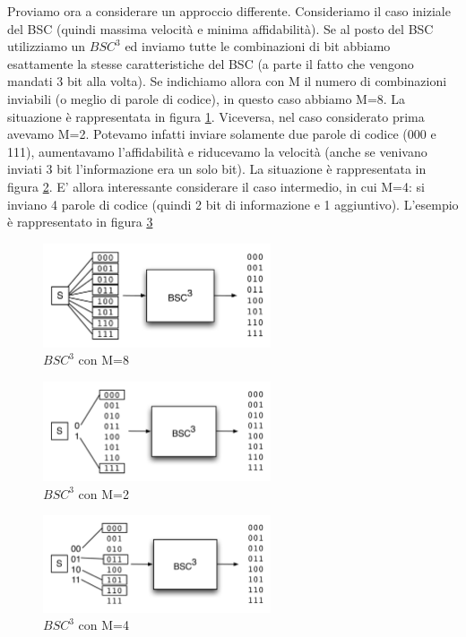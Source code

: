 Proviamo ora a considerare un approccio differente. Consideriamo il caso iniziale del BSC (quindi massima velocità e minima affidabilità). Se al posto del BSC utilizziamo un $BSC^3$ ed inviamo tutte le combinazioni di bit abbiamo esattamente la stesse caratteristiche del BSC (a parte il fatto che vengono mandati 3 bit alla volta). Se indichiamo allora con M il numero di combinazioni 
inviabili (o meglio di parole di codice), in questo caso abbiamo M=8.
La situazione è rappresentata in figura \ref{fig:mbsc1}.
Viceversa, nel caso considerato prima avevamo M=2. Potevamo infatti inviare solamente due parole di codice (000 e 111), aumentavamo 
l'affidabilità e riducevamo la velocità (anche se venivano inviati 3 bit l'informazione era un solo bit). 
La situazione è rappresentata in figura \ref{fig:mbsc2}.
E' allora interessante considerare il caso intermedio, in cui M=4: si inviano 4 parole di codice (quindi 2 bit di informazione e 1 aggiuntivo).
L'esempio è rappresentato in figura \ref{fig:mbsc3}


\begin{figure}[htbp]
\begin{center}
	\includegraphics[width=0.6\textwidth]{img/mbsc1.pdf}
\caption{$BSC^3$ con M=8}
\label{fig:mbsc1}
\end{center}
\end{figure}

\begin{figure}[htbp]
\begin{center}
	\includegraphics[width=0.6\textwidth]{img/mbsc2.pdf}
\caption{$BSC^3$ con M=2}
\label{fig:mbsc2}
\end{center}
\end{figure}

\begin{figure}[htbp]
\begin{center}
	\includegraphics[width=0.6\textwidth]{img/mbsc3.pdf}
\caption{$BSC^3$ con M=4}
\label{fig:mbsc3}
\end{center}
\end{figure}

